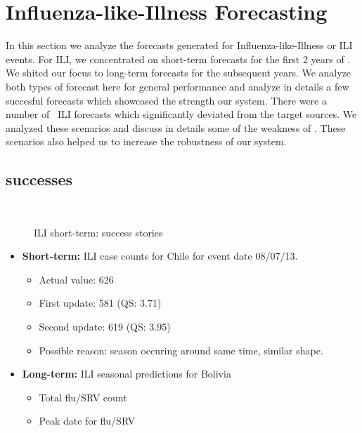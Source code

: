 \section{Influenza-like-Illness Forecasting}
In this section we analyze the forecasts generated for Influenza-like-Illness
or ILI events. For ILI, we concentrated on short-term forecasts for the first 
2 years of \EMBERS. We shited our focus to long-term forecasts for the subsequent
years. We analyze both types of forecast here for general performance and 
analyze in details a few succesful forecasts which showcased the strength 
our system. There were a number of \EMBERS~ILI forecasts which significantly
deviated from the target sources. We analyzed these scenarios and discuss in 
details some of the weakness of \EMBERS. These scenarios also helped us to 
increase the robustness of our system.


\subsection{successes}

\begin{figure}[tb!]
  \\

  \caption{\label{} ILI short-term: success stories}
\end{figure}

\begin{itemize}
  \item {\bf Short-term:} ILI case counts for Chile for event date 08/07/13.
    \begin{itemize}
      \item Actual value: 626
      \item First update: 581 (QS: 3.71)
      \item Second update: 619 (QS: 3.95)
      \item Possible reason: season occuring around same time, similar shape.
    \end{itemize}

  \item {\bf Long-term:} ILI seasonal predictions for Bolivia
    \begin{itemize}
      \item Total flu/SRV count
      \item Peak date for flu/SRV
    \end{itemize}
\end{itemize}

